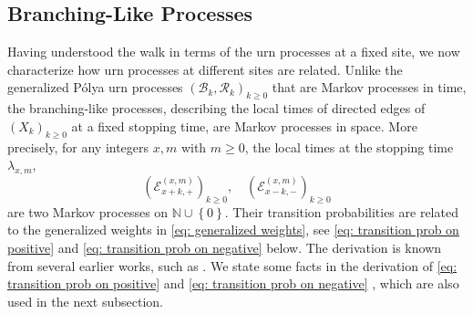 \documentclass[EJP]{ejpecp} %
\begin{document}
\subsection{Branching-Like Processes}
Having understood the walk in terms of the urn processes at a fixed site, we now characterize how urn processes at different sites are related. Unlike the generalized P\'{o}lya urn processes $(\mathscr{B}_k,\mathscr{R}_k )_{k \ge 0}$ that are Markov processes in time, the branching-like processes, describing the local times of directed edges of $(X_k)_{k\geq 0}$ at a fixed stopping time, are Markov processes in space.
More precisely, for any integers $x,m$ with $m\geq 0$, the local times at the stopping time $\lambda_{x,m}$, 
\[
\left(\mathcal{E}^{(x,m)}_{x+k,+} \right)_{k\geq 0}, \quad \left(\mathcal{E}^{(x,m)}_{x-k,-} \right)_{k\geq 0}
\]
are two Markov processes on $\mathbb{N}\cup\left\{0\right\}$. Their transition probabilities are related to the generalized weights in \eqref{eq: generalized weights}, see \eqref{eq: transition prob on positive} and \eqref{eq: transition prob on negative} below. The derivation is known from several earlier works, such as \cite{T96, KP16}. We state some facts in the derivation of \eqref{eq: transition prob on positive} and \eqref{eq: transition prob on negative} , which are also used in the next subsection.
\end{document}
